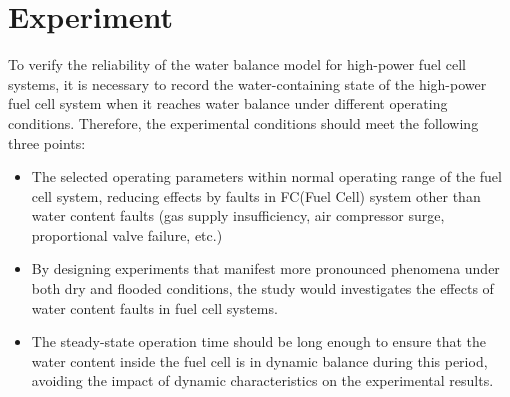 \section{Experiment}
To verify the reliability of the water balance model for high-power fuel cell systems, it is necessary to record the water-containing state of the high-power fuel cell system when it reaches water balance under different operating conditions. Therefore, the experimental conditions should meet the following three points:
\begin{itemize}
	\item The selected operating parameters within normal operating range of the fuel cell system, reducing effects by faults in FC(Fuel Cell) system other than water content faults (gas supply insufficiency, air compressor surge, proportional valve failure, etc.)
	\item By designing experiments that manifest more pronounced phenomena under both dry and flooded conditions, the study would investigates the effects of water content faults in fuel cell systems.
	\item The steady-state operation time should be long enough to ensure that the water content inside the fuel cell is in dynamic balance during this period, avoiding the impact of dynamic characteristics on the experimental results.
\end{itemize}
